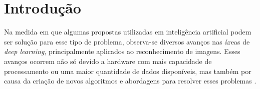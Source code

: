 \newpage
\clearpage
\section{Introdução}
Na medida em que algumas propostas utilizadas em inteligência artificial podem ser solução para esse tipo de problema, observa-se diversos avanços nas áreas de \textit{deep learning}, principalmente aplicados ao reconhecimento de imagens. Esses avanços ocorrem não só devido a hardware com mais capacidade de processamento ou uma maior quantidade de dados disponíveis, mas também por causa da criação de novos algoritmos e abordagens para resolver esses problemas \cite{Szegedy2015GoingConvolutions}. 

